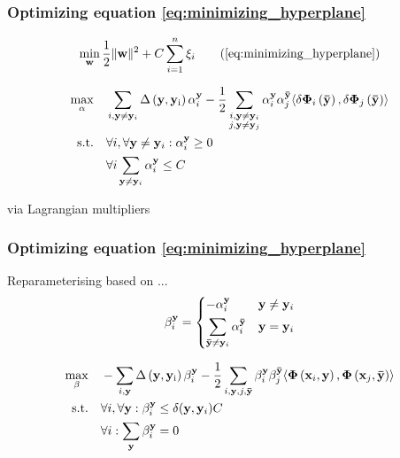 \begin{frame}
    \frametitle{Optimizing equation \eqref{eq:minimizing_hyperplane}}
    \begin{equation}
        \min_{\mathbf{w}} \frac{1}{2} \|\mathbf{w}\|^2 + C \sum_{i=1}^n \xi_i \tag{\ref{eq:minimizing_hyperplane}}
    \end{equation}

    \begin{equation}
        \begin{aligned}
            \max_{\alpha} \quad & \sum_{i, \mathbf{y} \ne \mathbf{y}_i} \operatorname{\Delta \left( \mathbf{y}, \mathbf{y}_i \right)} \alpha_i^\mathbf{y} -
                \frac{1}{2} \sum_{\substack{i, \mathbf{y} \ne \mathbf{y}_i \\ j, \mathbf{y} \ne \mathbf{y}_j}}
                \alpha_i^\mathbf{y} \alpha_j^\mathbf{\bar{y}} \langle \delta \mathbf{\Phi}_i \left( \mathbf{\bar{y}} \right),
                \delta \mathbf{\Phi}_j \left( \mathbf{\bar{y}} \right) \rangle \\
            \operatorname{\text{s.t.} \quad} & \forall i, \forall \mathbf{y} \ne \mathbf{y}_i : \alpha_i^\mathbf{y} \ge 0 \\
                & \forall i \sum_{\mathbf{y} \ne \mathbf{y}_i} \alpha_i^\mathbf{y} \le C
        \end{aligned}
    \end{equation}

    via Lagrangian multipliers
\end{frame}

\begin{frame}
    \frametitle{Optimizing equation \eqref{eq:minimizing_hyperplane}}
    Reparameterising based on ...
    \begin{equation}
        \beta_i^\mathbf{y} = \begin{dcases}
                                -\alpha_i^\mathbf{y} & \mathbf{y} \ne \mathbf{y}_i \\
                                \sum_{\mathbf{\bar{y}} \ne \mathbf{y}_i} \alpha_i^\mathbf{\bar{y}} & \mathbf{y} = \mathbf{y}_i
                             \end{dcases}
    \end{equation}

    \begin{equation} \label{eq:maximizig_beta}
        \begin{aligned}
            \max_{\beta} \quad & -\sum_{i,\mathbf{y}} \operatorname{\Delta \left( \mathbf{y}, \mathbf{y}_i \right)} \beta_i^\mathbf{y} -
                \frac{1}{2} \sum_{i,\mathbf{y},j,\mathbf{\bar{y}}} \beta_i^\mathbf{y}
                \beta_j^\mathbf{\bar{y}} \langle \mathbf{\Phi}\left( \mathbf{x}_i, \mathbf{y}
                \right), \mathbf{\Phi}\left( \mathbf{x}_j, \mathbf{\bar{y}} \right) \rangle \\
            \operatorname{\text{s.t.} \quad} & \forall i, \forall \mathbf{y} : \beta_i^\mathbf{y} \le \delta(\mathbf{y}, \mathbf{y}_i) C \\
                & \forall i: \sum_\mathbf{y} \beta_i^\mathbf{y} = 0
        \end{aligned}
    \end{equation}
\end{frame}

